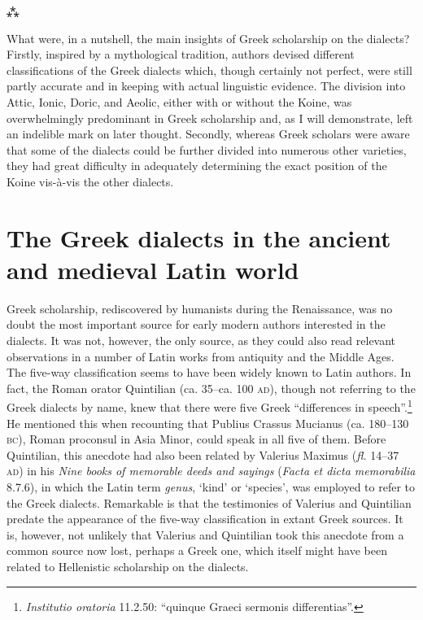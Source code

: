 \begin{center}
\Large⁂
\end{center}

\noindent What were, in a nutshell, the main insights of Greek scholarship on the dialects? Firstly, inspired by a mythological tradition, authors devised different classifications of the Greek dialects which, though certainly not perfect, were still partly accurate and in keeping with actual linguistic evidence. The division into Attic, Ionic, Doric, and Aeolic, either with or without the Koine, was overwhelmingly predominant in Greek scholarship and, as I will demonstrate, left an indelible mark on later thought. Secondly, whereas Greek scholars were aware that some of the dialects could be further divided into numerous other varieties, they had great difficulty in adequately determining the exact position of the Koine vis-à-vis the other dialects.

\section{The Greek dialects in the ancient and medieval Latin world}\label{sec:2.5}

Greek scholarship, rediscovered by humanists during the Renaissance, was no doubt the most important source for early modern authors interested in the dialects. It was not, however, the only source, as they could also read relevant observations in a number of Latin works from antiquity and the Middle Ages. The five-way classification seems to have been widely known to Latin authors. In fact, the Roman orator Quintilian (ca. 35–ca. 100 \textsc{ad}), though not referring to the Greek dialects by name, knew that there were five Greek “differences in speech”.\footnote{{\textit{Institutio oratoria}} {11.2.50: “quinque Graeci sermonis differentias”.}} He mentioned this when recounting that Publius Crassus Mucianus (ca. 180–130 \textsc{bc}), Roman proconsul in Asia Minor, could speak in all five of them. Before Quintilian, this anecdote had also been related by Valerius Maximus (\textit{fl.} 14–37 \textsc{ad}) in his \textit{Nine books of memorable deeds and sayings} (\textit{Facta et dicta memorabilia} 8.7.6), in which the Latin term \textit{genus}, ‘kind’ or ‘species’, was employed to refer to the Greek dialects. Remarkable is that the testimonies of Valerius and Quintilian predate the appearance of the five-way classification in extant Greek sources. It is, however, not unlikely that Valerius and Quintilian took this anecdote from a common source now lost, perhaps a Greek one, which itself might have been related to Hellenistic scholarship on the dialects.

